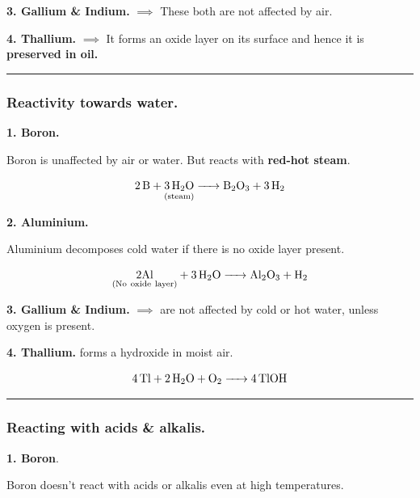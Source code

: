 \documentclass[twocolumn]{article}
\begin{document}
\vspace*{0.2in} 

\textbf{3. Gallium \& Indium.} \(\implies\) These both are not affected by air. 

\vspace*{0.2in} 

\textbf{4. Thallium.}  \(\implies\) It forms an oxide layer on its surface and hence it is \textbf{preserved in oil.}  

\vspace*{0.1in} 

\hrule

\subsubsection*{Reactivity towards water.}

\textbf{1. Boron.} 

Boron is unaffected by air or water. But reacts with \textbf{red-hot steam}. 

\[
    \ce{ 2B + \underset{ (steam) }{ \ce{ 3H2O }  } -> B2O3 + 3H2 } 
\]

\vspace*{0.1in} 

\textbf{2. Aluminium.}

Aluminium decomposes cold water if there is no oxide layer present. 

\[
    \ce{ \underset{ (No\ oxide\ layer) }{ 2Al} + 3H2O -> Al2O3 + H2 } 
\]

\vspace*{0.1in} 

\textbf{3. Gallium \& Indium.} \(\implies\) are not affected by cold or hot water, unless oxygen is present. 

\vspace*{0.1in} 

\textbf{4. Thallium.} forms a hydroxide in moist air. 

\[
    \ce{ 4Tl + 2H2O + O2 -> 4TlOH } 
\]

\vspace*{0.2in}

\hrule

\subsubsection*{Reacting with acids \& alkalis.}

\textbf{1. Boron}. 

Boron doesn't react with acids or alkalis even at high temperatures. 
\end{document}
